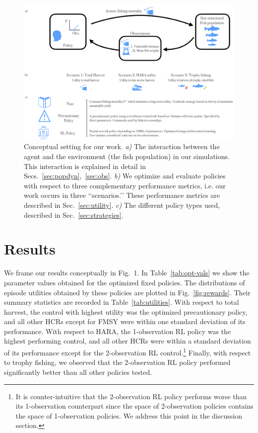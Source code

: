 \documentclass[floatfix,nofootinbib,longbibliography,notitlepage]{revtex4-2}
\begin{document}
\begin{figure}[h!]
	\includegraphics[width=.9\linewidth]{conceptual.png}
\caption{
\label{fig:conceptual}
Conceptual setting for our work. \emph{a)} The interaction between the agent and the environment (the fish population) in our simulations. This interaction is explained in detail in Secs.~\ref{sec:popdyn},~\ref{sec:obs}. \emph{b)} We optimize and evaluate policies with respect to three complementary performance metrics, i.e. our work occurs in three ‘‘scenarios.’’ These performance metrics are described in Sec.~\ref{sec:utility}. \emph{c)} The different policy types used, described in Sec.~\ref{sec:strategies}.
}
\end{figure}

%
%
%
\section{Results}

We frame our results conceptually in Fig.~1.
In Table~\ref{tab:opt-vals} we show the parameter values obtained for the optimized fixed policies. 
The distributions of episode utilities obtained by these policies are plotted in Fig.~\ref{fig:rewards}.
Their summary statistics are recorded in Table~\ref{tab:utilities}. 
With respect to total harvest, the control with highest utility was the optimized precautionary policy, and all other HCRs except for FMSY were within one standard deviation of its performance. 
With respect to HARA, the 1-observation RL policy was the highest performing control, and all other HCRs were within a standard deviation of its performance except for the 2-observation RL control.\footnote{
	It is counter-intuitive that the 2-observation RL policy performs worse than its 1-observation counterpart since the space of 2-observation policies contains the space of 1-observation policies. 
	We address this point in the discussion section.
}
Finally, with respect to trophy fishing, we observed that the 2-observation RL policy performed significantly better than all other policies tested.
\end{document}
